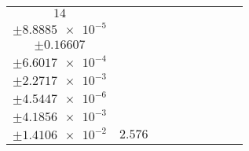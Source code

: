 \documentclass[8pt]{article}
\begin{document}
\begin{longtable}[l]{c c c c c c c c c}
$\num{14}$ & \begin{tabular}[c]{@{}c@{}}$\num{3.0706e-2}$ \\ $\pm\num{8.8885e-5}$\end{tabular} & \begin{tabular}[c]{@{}c@{}}$\num{0.19689}$ \\ $\pm\num{0.16607}$\end{tabular} & \begin{tabular}[c]{@{}c@{}}$\num{15.889}$ \\ $\pm\num{6.6017e-4}$\end{tabular} & \begin{tabular}[c]{@{}c@{}}$\num{1.4542e+3}$ \\ $\pm\num{2.2717e-3}$\end{tabular} & \begin{tabular}[c]{@{}c@{}}$\num{2.9092}$ \\ $\pm\num{4.5447e-6}$\end{tabular} & \begin{tabular}[c]{@{}c@{}}$\num{1.1877}$ \\ $\pm\num{4.1856e-3}$\end{tabular} & \begin{tabular}[c]{@{}c@{}}$\num{4.228}$ \\ $\pm\num{1.4106e-2}$\end{tabular} & $\num{2.576}$\\
\bottomrule
\end{longtable}
\end{document}
